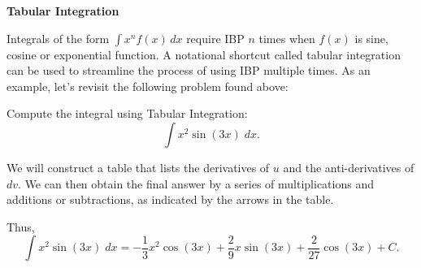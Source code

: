 \documentclass{ximera}
\begin{document}
\begin{center}
\textbf{Tabular Integration}
\end{center}

Integrals of the form $\int x^n f(x) \,dx$ require IBP $n$ times when $f(x)$ is sine, cosine or exponential function.
A notational shortcut called tabular integration can be used to streamline the process of using IBP multiple times.
As an example, let's revisit the following problem found above:

\begin{example}
Compute the integral using Tabular Integration:
  \[
  \int x^2\sin(3x) \;dx.
  \]

We will construct a table that lists the derivatives of $u$ and the anti-derivatives of $dv$.
We can then obtain the final answer by a series of multiplications and additions or subtractions, as indicated
by the arrows in the table.


\begin{image}[5cm]
\end{image}

Thus,
\[
  \int x^2\sin(3x) \;dx = -\frac13 x^2\cos(3x) + \frac29x\sin(3x) + \frac{2}{27} \cos(3x) + C.
  \]

\end{example}
\end{document}
